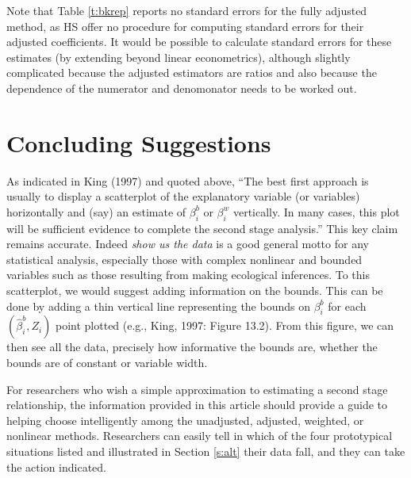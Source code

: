 \documentclass[11pt,titlepage]{article}
\begin{document}
Note that Table \ref{t:bkrep} reports no standard errors for the fully
adjusted method, as HS offer no procedure for computing standard
errors for their adjusted coefficients.  It would be possible to
calculate standard errors for these estimates (by extending beyond
linear econometrics), although slightly complicated because the
adjusted estimators are ratios and also because the dependence of the
numerator and denomonator needs to be worked out.

\section{Concluding Suggestions}

As indicated in King (1997) and quoted above, ``The best first
approach is usually to display a scatterplot of the explanatory
variable (or variables) horizontally and (say) an estimate of
$\beta_i^b$ or $\beta_i^w$ vertically.  In many cases, this plot will
be sufficient evidence to complete the second stage analysis.''  This
key claim remains accurate.  Indeed \emph{show us the data} is a good
general motto for any statistical analysis, especially those with
complex nonlinear and bounded variables such as those resulting from
making ecological inferences.  To this scatterplot, we would suggest
adding information on the bounds.  This can be done by adding a thin
vertical line representing the bounds on $\beta_i^b$ for each
$(\hat\beta_i^b,Z_i)$ point plotted (e.g., King, 1997: Figure 13.2).
From this figure, we can then see all the data, precisely how
informative the bounds are, whether the bounds are of constant or
variable width.

For researchers who wish a simple approximation to estimating a second
stage relationship, the information provided in this article should
provide a guide to helping choose intelligently among the unadjusted,
adjusted, weighted, or nonlinear methods.  Researchers can easily tell
in which of the four prototypical situations listed and illustrated in
Section \ref{s:alt} their data fall, and they can take the action
indicated.
\end{document}
